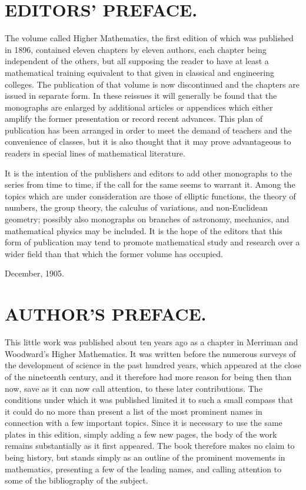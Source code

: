 \documentclass[oneside]{book}
\begin{document}
\indent

\newpage

\chapter{EDITORS' PREFACE.}

The volume called Higher Mathematics, the first edition of which was
published in 1896, contained eleven chapters by eleven authors, each
chapter being independent of the others, but all supposing the
reader to have at least a mathematical training equivalent to that
given in classical and engineering colleges. The publication of that
volume is now discontinued and the chapters are issued in separate
form. In these reissues it will generally be found that the
monographs are enlarged by additional articles or appendices which
either amplify the former presentation or record recent
advances. This plan of publication has been arranged in order to
meet the demand of teachers and the convenience of classes, but it
is also thought that it may prove advantageous to readers in special
lines of mathematical literature.

It is the intention of the publishers and editors to add other
monographs to the series from time to time, if the call for the same
seems to warrant it. Among the topics which are under consideration
are those of elliptic functions, the theory of numbers, the group
theory, the calculus of variations, and non-Euclidean geometry;
possibly also monographs on branches of astronomy, mechanics, and
mathematical physics may be included. It is the hope of the editors
that this form of publication may tend to promote mathematical study
and research over a wider field than that which the former volume
has occupied.

\bigskip

December, 1905.

\normalsize

\chapter{AUTHOR'S PREFACE.}

This little work was published about ten years ago as a chapter in
Merriman and Woodward's Higher Mathematics. It was written before
the numerous surveys of the development of science in the past
hundred years, which appeared at the close of the nineteenth
century, and it therefore had more reason for being then than now,
save as it can now call attention, to these later contributions. The
conditions under which it was published limited it to such a small
compass that it could do no more than present a list of the most
prominent names in connection with a few important topics. Since it
is necessary to use the same plates in this edition, simply adding a
few new pages, the body of the work remains substantially as it
first appeared. The book therefore makes no claim to being history,
but stands simply as an outline of the prominent movements in
mathematics, presenting a few of the leading names, and calling
attention to some of the bibliography of the subject.
\end{document}
